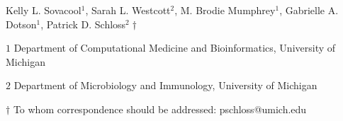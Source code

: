 
\begin{center}
\vspace{25mm}

Kelly L. Sovacool${^1}$, Sarah L. Westcott${^2}$, M. Brodie Mumphrey${^1}$, Gabrielle A. Dotson${^1}$, Patrick D. Schloss${^2\dagger}$

$1$ Department of Computational Medicine and Bioinformatics, University of Michigan

$2$ Department of Microbiology and Immunology, University of Michigan

\vspace{30mm}

$\dagger$ To whom correspondence should be addressed: pschloss@umich.edu

\end{center}


\newpage
\linenumbers
